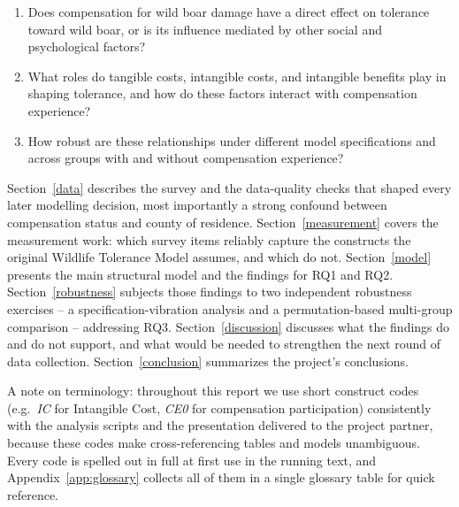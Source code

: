\begin{enumerate}
  \item[\textbf{RQ1}] Does compensation for wild boar damage have a direct
    effect on tolerance toward wild boar, or is its influence mediated by other
    social and psychological factors?
  \item[\textbf{RQ2}] What roles do tangible costs, intangible costs, and
    intangible benefits play in shaping tolerance, and how do these factors
    interact with compensation experience?
  \item[\textbf{RQ3}] How robust are these relationships under different model
    specifications and across groups with and without compensation experience?
\end{enumerate}

Section~\ref{data} describes the survey and the data-quality checks that shaped
every later modelling decision, most importantly a strong confound between
compensation status and county of residence. Section~\ref{measurement} covers
the measurement work: which survey items reliably capture the constructs the
original Wildlife Tolerance Model \citep{Kansky2016} assumes, and which do not.
Section~\ref{model} presents the main structural model and the findings for
RQ1 and RQ2. Section~\ref{robustness} subjects those findings to two independent
robustness exercises -- a specification-vibration analysis and a permutation-based
multi-group comparison -- addressing RQ3. Section~\ref{discussion} discusses what
the findings do and do not support, and what would be needed to strengthen the
next round of data collection. Section~\ref{conclusion} summarizes the project's
conclusions.

A note on terminology: throughout this report we use short construct codes
(e.g.\ \emph{IC} for Intangible Cost, \emph{CE0} for compensation participation)
consistently with the analysis scripts and the presentation delivered to the
project partner, because these codes make cross-referencing tables and models
unambiguous. Every code is spelled out in full at first use in the running text,
and Appendix~\ref{app:glossary} collects all of them in a single glossary table
for quick reference.
